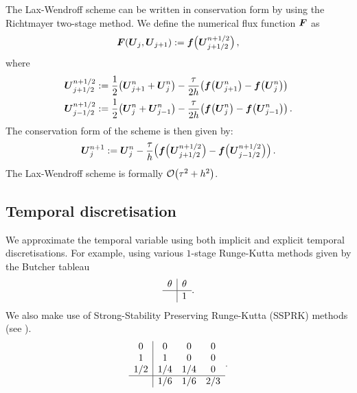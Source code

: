 \documentclass[final]{amsart}
\renewcommand{\vec}[1]{\geovec{#1}}
\numberwithin{equation}{section}
\begin{document}
\begin{Rem}
  The Lax-Wendroff scheme can be written in conservation form by
        using the Richtmayer two-stage method.  We define the numerical
        flux function $\vec F$ as
	\begin{equation}\label{eq_F_LxW_cons}
	\vec F\qp{\vec U_j,\vec U_{j+1}}:= \vec f\qp{\vec U^{n+1/2}_{j+1/2}},
	\end{equation}
	where 
	\begin{equation}
	\begin{split}
	\vec U^{n+1/2}_{j+1/2}&:=\frac{1}{2}\qp{\vec U^n_{j+1} + \vec U^n_{j}}-\frac{\tau}{2h}\qp{\vec f\qp{\vec U^n_{j+1}}-\vec f\qp{\vec U^n_j}}\\
	\vec U^{n+1/2}_{j-1/2}&:=\frac{1}{2}\qp{\vec U^n_{j} + \vec U^n_{j-1}}-\frac{\tau}{2h}\qp{\vec f\qp{\vec U^n_{j}}-\vec f\qp{\vec U^n_{j-1}}}.
	\end{split}
	\end{equation}
	The conservation form of the scheme is then given by:
	\begin{equation}\label{eq_LxW_scheme}
	\vec U^{n+1}_j:= \vec  U^n_j-\frac{\tau}{h}\qp{\vec f\qp{\vec U^{n+1/2}_{j+1/2}}-\vec f\qp{\vec U^{n+1/2}_{j-1/2}}}.
	\end{equation}
	The Lax-Wendroff scheme is formally $\mathcal{O}\!\left({\tau^2 +h^2}\right)$.
\end{Rem}


\subsection{Temporal discretisation}
We approximate the temporal variable using both implicit and explicit
temporal discretisations.  For example, using various $1$-stage Runge-Kutta methods given by the Butcher tableau
\begin{equation}
  \begin{array}
    {c|c}
    \theta & \theta
    \\
    \hline
    & 1 
  \end{array}.
\end{equation}
We also make use of Strong-Stability Preserving
Runge-Kutta (SSPRK) methods (see \cite{gottlieb2001strong}).
\begin{equation}
  \begin{array}{c|ccc}0&0&0&0\\1&1&0&0\\1/2&1/4&1/4&0\\\hline &1/6&1/6&2/3\\\end{array}.
\end{equation}
\end{document}

